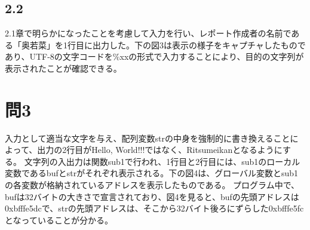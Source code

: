 \documentclass[dvipdfmx,autodetect-engine,titlepage]{jsarticle}
\begin{document}
\begin{figure}[H]
  \centering
  \caption{}\label{fig:図2}
\end{figure}

\subsection*{2.2}
2.1章で明らかになったことを考慮して入力を行い、レポート作成者の名前である「奥若菜」を1行目に出力した。下の図3は表示の様子をキャプチャしたものであり、UTF-8の文字コードを\%xxの形式で入力することにより、目的の文字列が表示されたことが確認できる。\\

\begin{figure}[H]
  \centering
  \caption{}\label{fig:図3}
\end{figure}

\section*{問3}
入力として適当な文字を与え、配列変数strの中身を強制的に書き換えることによって、出力の2行目がHello, World!!!ではなく、Ritsumeikanとなるようにする。
文字列の入出力は関数sub1で行われ、1行目と2行目には、sub1のローカル変数であるbufとstrがそれぞれ表示される。下の図4は、グローバル変数とsub1の各変数が格納されているアドレスを表示したものである。
プログラム中で、bufは32バイトの大きさで宣言されており、図4を見ると、bufの先頭アドレスは
0xbfffe5dcで、strの先頭アドレスは、そこから32バイト後ろにずらした0xbfffe5fcとなっていることが分かる。\\
\end{document}
